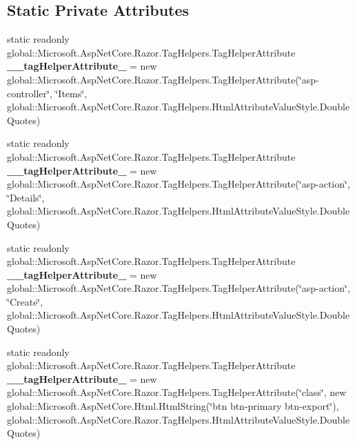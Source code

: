 \subsection*{Static Private Attributes}
\begin{DoxyCompactItemize}
\item 
\mbox{\label{class_asp_net_core_1_1_views___items___index_addf5e04262c6ee22ce2e6801edd15d92}} 
static readonly global\+::\+Microsoft.\+Asp\+Net\+Core.\+Razor.\+Tag\+Helpers.\+Tag\+Helper\+Attribute {\bfseries \+\_\+\+\_\+tag\+Helper\+Attribute\+\_} = new global\+::\+Microsoft.\+Asp\+Net\+Core.\+Razor.\+Tag\+Helpers.\+Tag\+Helper\+Attribute(\char`\"{}asp-\/controller\char`\"{}, \char`\"{}Items\char`\"{}, global\+::\+Microsoft.\+Asp\+Net\+Core.\+Razor.\+Tag\+Helpers.\+Html\+Attribute\+Value\+Style.\+Double\+Quotes)
\item 
\mbox{\label{class_asp_net_core_1_1_views___items___index_aa256245796035637c8177373f2fb1c9e}} 
static readonly global\+::\+Microsoft.\+Asp\+Net\+Core.\+Razor.\+Tag\+Helpers.\+Tag\+Helper\+Attribute {\bfseries \+\_\+\+\_\+tag\+Helper\+Attribute\+\_} = new global\+::\+Microsoft.\+Asp\+Net\+Core.\+Razor.\+Tag\+Helpers.\+Tag\+Helper\+Attribute(\char`\"{}asp-\/action\char`\"{}, \char`\"{}Details\char`\"{}, global\+::\+Microsoft.\+Asp\+Net\+Core.\+Razor.\+Tag\+Helpers.\+Html\+Attribute\+Value\+Style.\+Double\+Quotes)
\item 
\mbox{\label{class_asp_net_core_1_1_views___items___index_ae3e491fbdebe1805eef073e285aa01d2}} 
static readonly global\+::\+Microsoft.\+Asp\+Net\+Core.\+Razor.\+Tag\+Helpers.\+Tag\+Helper\+Attribute {\bfseries \+\_\+\+\_\+tag\+Helper\+Attribute\+\_} = new global\+::\+Microsoft.\+Asp\+Net\+Core.\+Razor.\+Tag\+Helpers.\+Tag\+Helper\+Attribute(\char`\"{}asp-\/action\char`\"{}, \char`\"{}Create\char`\"{}, global\+::\+Microsoft.\+Asp\+Net\+Core.\+Razor.\+Tag\+Helpers.\+Html\+Attribute\+Value\+Style.\+Double\+Quotes)
\item 
\mbox{\label{class_asp_net_core_1_1_views___items___index_aa767db38f0e48425bbdbb7a08f006352}} 
static readonly global\+::\+Microsoft.\+Asp\+Net\+Core.\+Razor.\+Tag\+Helpers.\+Tag\+Helper\+Attribute {\bfseries \+\_\+\+\_\+tag\+Helper\+Attribute\+\_} = new global\+::\+Microsoft.\+Asp\+Net\+Core.\+Razor.\+Tag\+Helpers.\+Tag\+Helper\+Attribute(\char`\"{}class\char`\"{}, new global\+::\+Microsoft.\+Asp\+Net\+Core.\+Html.\+Html\+String(\char`\"{}btn btn-\/primary btn-\/export\char`\"{}), global\+::\+Microsoft.\+Asp\+Net\+Core.\+Razor.\+Tag\+Helpers.\+Html\+Attribute\+Value\+Style.\+Double\+Quotes)

\end{DoxyCompactItemize}
